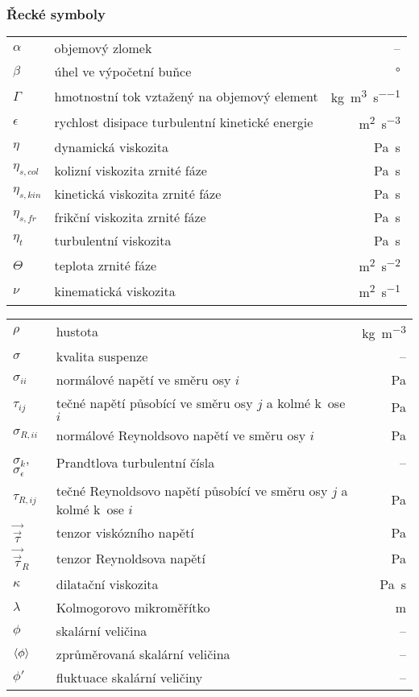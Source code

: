 \subsubsection*{Řecké symboly}
\begin{tabularx}{\textwidth}{@{}p{2.5cm} X r@{}}

$\alpha$ & objemový zlomek & --\\
$\beta$ & úhel ve výpočetní buňce & \si{\degree}\\
$\Gamma$ & hmotnostní tok vztažený na objemový element & \si{\kilogram\per\cubic\meter\per\second} \\ 
$\epsilon$ & rychlost disipace turbulentní kinetické energie & \si{\meter\squared\per\second\cubed}\\
$\eta$ & dynamická viskozita & \si{\pascal\second}\\
$\eta_{s,col}$ & kolizní viskozita zrnité fáze & \si{\pascal\second}\\
$\eta_{s,kin}$ & kinetická viskozita zrnité fáze & \si{\pascal\second}\\
$\eta_{s,fr}$ & frikční viskozita zrnité fáze & \si{\pascal\second}\\
$\eta_{t}$ & turbulentní viskozita & \si{\pascal\second}\\
$\Theta$ & teplota zrnité fáze & \si{\meter\squared\per\second\squared} \\
$\nu$ & kinematická viskozita & \si{\meter\squared\per\second}\\

\end{tabularx}
\begin{tabularx}{\textwidth}{@{}p{2.5cm} X r@{}}
$\rho$ & hustota & \si{\kilogram\per\cubic\meter} \\
$\sigma$ & kvalita suspenze & -- \\
$\sigma_{ii}$ & normálové napětí ve směru osy $i$ & \si{\pascal} \\
$\tau_{ij}$ & tečné napětí působící ve směru osy $j$ a kolmé k~ose $i$ & \si{\pascal} \\
$\sigma_{R,ii}$ & normálové Reynoldsovo napětí ve směru osy $i$ & \si{\pascal} \\
$\sigma_{k}$, $\sigma_{\epsilon}$ & Prandtlova turbulentní čísla & -- \\
$\tau_{R,ij}$ & tečné Reynoldsovo napětí působící ve směru osy $j$ a kolmé k~ose $i$ & \si{\pascal} \\
$\vec{\vec{\tau}}$ & tenzor viskózního napětí & \si{\pascal} \\
$\vec{\vec{\tau}}_{R}$ & tenzor Reynoldsova napětí & \si{\pascal} \\
$\kappa$ & dilatační viskozita & \si{\pascal\second}\\
$\lambda$ & Kolmogorovo mikroměřítko & \si{\meter}\\
$\phi$ & skalární veličina & --\\
$\left< \phi \right>$ & zprůměrovaná skalární veličina & --\\
$\phi'$ & fluktuace skalární veličiny & --\\

\end{tabularx}

